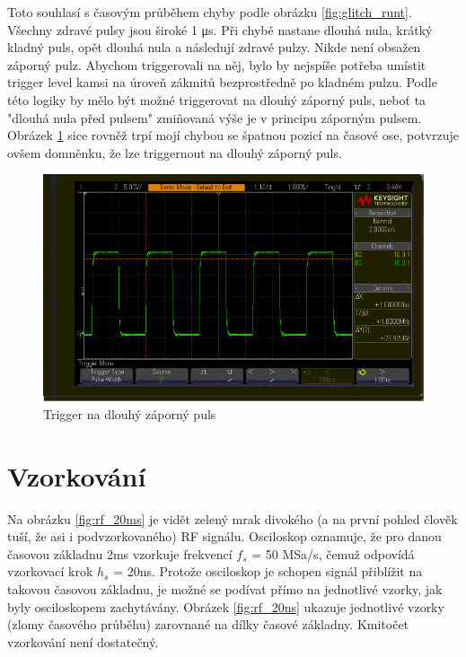 \documentclass[twoside]{article}
\begin{document}
Toto souhlasí s časovým průběhem chyby podle obrázku \ref{fig:glitch_runt}.
Všechny zdravé pulsy jsou široké 1 \si{\micro\second}. Při chybě nastane dlouhá nula, krátký kladný puls, opět dlouhá nula a následují zdravé pulzy.
Nikde není obsažen záporný pulz. Abychom triggerovali na něj, bylo by nejspíše potřeba umístit trigger level kamsi na úroveň zákmitů bezprostředně po kladném pulzu.
Podle této logiky by mělo být možné triggerovat na dlouhý záporný puls, neboť ta "dlouhá nula před pulsem" zmiňovaná výše je v principu záporným pulsem.
Obrázek \ref{fig:neg_width_trigger} sice rovněž trpí mojí chybou se špatnou pozicí na časové ose, potvrzuje ovšem domněnku, že lze triggernout na dlouhý záporný puls.

\begin{figure}[htbp]
	\centering

	\includegraphics[width=0.8\linewidth]{trigger_pulsewidth_neg_triggers_always_wut.png         }
	\caption{Trigger na dlouhý záporný puls}
	\label{fig:neg_width_trigger}
\end{figure}	

\section{Vzorkování}

Na obrázku \ref{fig:rf_20ms} je vidět zelený mrak divokého (a na první pohled člověk tuší, že asi i podvzorkovaného) RF signálu. Osciloskop oznamuje,
že pro danou časovou základnu 2ms vzorkuje frekvencí $f_s$ = 50 MSa/s, čemuž odpovídá vzorkovací krok $h_s$ = 20ns. Protože osciloskop je schopen signál přiblížit
na takovou časovou základnu, je možné se podívat přímo na jednotlivé vzorky, jak byly osciloskopem zachytávány. Obrázek \ref{fig:rf_20ns} ukazuje jednotlivé vzorky
(zlomy časového průběhu) zarovnané na dílky časové základny. Kmitočet vzorkování není dostatečný.
\end{document}
